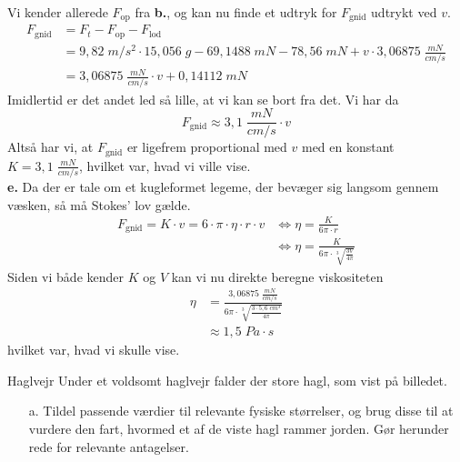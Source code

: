 \documentclass{report}
\begin{document}
Vi kender allerede $F_{\text{op} }$ fra \textbf{b.}, og kan nu finde et udtryk for $F _{\text{gnid} }$ udtrykt ved $v$. 
\begin{equation*}
\begin{split}
  F _{\text{gnid} }&=F_t- F _{\text{op} }-F _{\text{lod} }\\
  &=9,82 \;\unit{m/s^2} \cdot 15,056 \;\unit{g} - 69,1488 \;\unit{mN} - 78,56 \;\unit{mN}+v \cdot 3,06875 \;\unit{\frac{\unit{mN}}{\unit{cm/s}}}\\
  &=3,06875 \;\unit{\frac{\unit{mN}}{\unit{cm/s}}} \cdot v + 0,14112 \;\unit{mN} 
\end{split}
\end{equation*}
Imidlertid er det andet led så lille, at vi kan se bort fra det.
Vi har da
\[
F _{\text{gnid} }\approx 3,1 \;\unit{\frac{mN}{cm/s}} \cdot v
\] 
Altså har vi, at $F _{\text{gnid} }$ er ligefrem proportional med $v$ med en konstant $K=3,1 \;\unit{\frac{mN}{cm/s}}$, hvilket var, hvad vi ville vise.\\[1ex]
\textbf{e.}
Da der er tale om et kugleformet legeme, der bevæger sig langsom gennem væsken, så må Stokes' lov gælde.
\begin{equation*}
\begin{split}
  F _{\text{gnid} }=K \cdot v=6 \cdot \pi \cdot \eta \cdot r \cdot v &\iff \eta=\frac{K}{6\pi \cdot r}\\
  &\iff \eta =\frac{K}{6\pi \cdot \sqrt[3]{\frac{3V}{4\pi}}}
\end{split}
\end{equation*}
Siden vi både kender $K$ og $V$ kan vi nu direkte beregne viskositeten
\begin{equation*}
\begin{split}
  \eta&=\frac{3,06875 \;\unit{\frac{mN}{cm/s}} }{6\pi \cdot \sqrt[3]{\frac{3 \cdot 5,6 \;\unit{cm^3}}{4 \pi}}}\\
  &\approx 1,5 \;\unit{Pa \cdot s} 
\end{split}
\end{equation*}
hvilket var, hvad vi skulle vise. 
\begin{question}{Haglvejr}{}
  Under et voldsomt haglvejr falder der store hagl, som vist på billedet.
  \begin{itemize}
    \item[a.] Tildel passende værdier til relevante fysiske størrelser, og brug disse til at vurdere den fart, hvormed et af de viste hagl rammer jorden. Gør herunder rede for relevante antagelser.
  \end{itemize}
\end{question}
\end{document}
